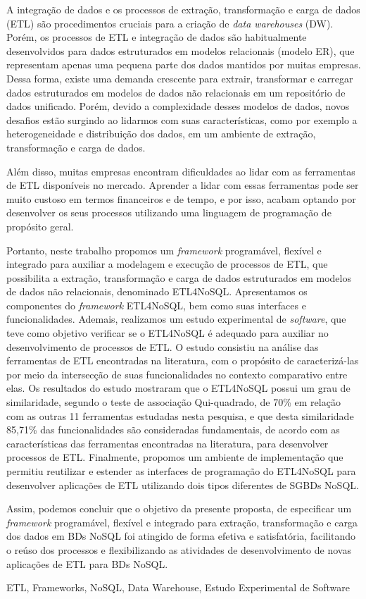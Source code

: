 
A integração de dados e os processos de extração, transformação e carga de dados (ETL) são procedimentos cruciais para a criação de \textit{data warehouses} (DW). Porém, os processos de ETL e integração de dados são habitualmente desenvolvidos para dados estruturados em modelos relacionais (modelo ER), que representam apenas uma pequena parte dos dados mantidos por muitas empresas. Dessa forma, existe uma demanda crescente para extrair, transformar e carregar dados estruturados em modelos de dados não relacionais em um repositório de dados unificado. Porém, devido a complexidade desses modelos de dados, novos desafios estão surgindo ao lidarmos com suas características, como por exemplo a heterogeneidade e distribuição dos dados, em um ambiente de extração, transformação e carga de dados.

Além disso, muitas empresas encontram dificuldades ao lidar com as ferramentas de ETL disponíveis no mercado. Aprender a lidar com essas ferramentas pode ser muito custoso em termos financeiros e de tempo, e por isso, acabam optando por desenvolver os seus processos utilizando uma linguagem de programação de propósito geral.

Portanto, neste trabalho propomos um \textit{framework} programável, flexível e integrado para auxiliar a modelagem e execução de processos de ETL, que possibilita a extração, transformação e carga de dados estruturados em modelos de dados não relacionais, denominado ETL4NoSQL. Apresentamos os componentes do \textit{framework} ETL4NoSQL, bem como suas interfaces e funcionalidades. Ademais, realizamos um estudo experimental de \textit{software}, que teve como objetivo verificar se o ETL4NoSQL é adequado para auxiliar no desenvolvimento de processos de ETL. O estudo consistiu na análise das ferramentas de ETL encontradas na literatura, com o propósito de caracterizá-las por meio da intersecção de suas funcionalidades no contexto comparativo entre elas. Os resultados do estudo mostraram que o ETL4NoSQL possui um grau de similaridade, segundo o teste de associação Qui-quadrado, de 70\% em relação com as outras 11 ferramentas estudadas nesta pesquisa, e que desta similaridade 85,71\% das funcionalidades são consideradas fundamentais, de acordo com as características das ferramentas encontradas na literatura, para desenvolver processos de ETL. Finalmente, propomos um ambiente de implementação que permitiu reutilizar e estender as interfaces de programação do ETL4NoSQL para desenvolver aplicações de ETL utilizando dois tipos diferentes de SGBDs NoSQL.

Assim, podemos concluir que o objetivo da presente proposta, de especificar um \textit{framework} programável, flexível e integrado para extração, transformação e carga dos dados em BDs NoSQL foi atingido de forma efetiva e satisfatória, facilitando o reúso dos processos e flexibilizando as atividades de desenvolvimento de novas aplicações de ETL para BDs NoSQL.

\begin{keywords}
ETL, Frameworks, NoSQL, Data Warehouse, Estudo Experimental de Software
\end{keywords}